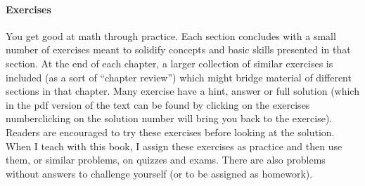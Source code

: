 \documentclass[10pt,]{book}
\theoremstyle{plain}
\theoremstyle{definition}
\theoremstyle{definition}
\theoremstyle{definition}
\theoremstyle{definition}
\numberwithin{equation}{chapter}
\begin{document}
\paragraph[{Exercises}]{Exercises}\hypertarget{paragraphs-4}{}
\hypertarget{p-18}{}%
You get good at math through practice. Each section concludes with a small number of exercises meant to solidify concepts and basic skills presented in that section. At the end of each chapter, a larger collection of similar exercises is included (as a sort of ``chapter review'') which might bridge material of different sections in that chapter. Many exercise have a hint, answer or full solution (which in the pdf version of the text can be found by clicking on the exercises number\textemdash{}clicking on the solution number will bring you back to the exercise). Readers are encouraged to try these exercises before looking at the solution. When I teach with this book, I assign these exercises as practice and then use them, or similar problems, on quizzes and exams.  There are also problems without answers to challenge yourself (or to be assigned as homework).%
\setcounter{tocdepth}{2}
\renewcommand*\contentsname{Contents}
\tableofcontents
\mainmatter
\typeout{************************************************}
\typeout{************************************************}
\end{document}
